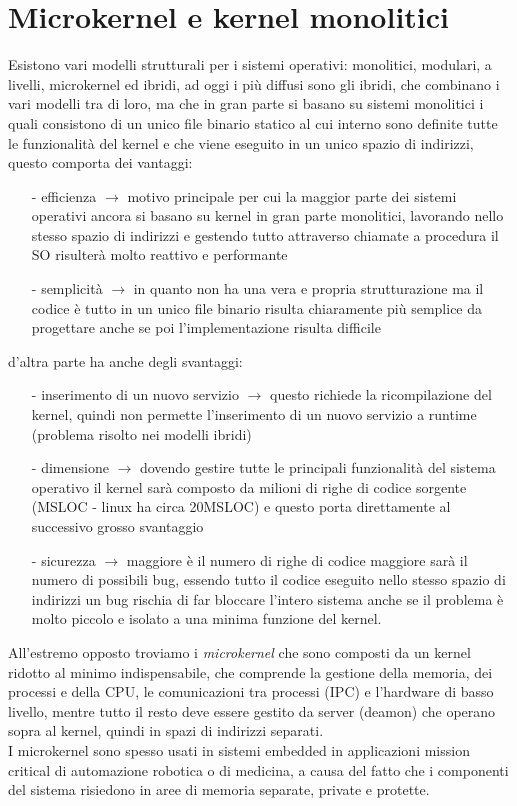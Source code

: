 \section{Microkernel e kernel monolitici}
Esistono vari modelli strutturali per i sistemi operativi: monolitici, modulari, a livelli, microkernel ed ibridi, ad oggi i più diffusi sono gli ibridi, che combinano i vari modelli tra di loro, ma che in gran parte si basano su sistemi monolitici i quali consistono di un unico file binario statico al cui interno sono definite tutte le funzionalità del kernel e che viene eseguito in un unico spazio di indirizzi, questo comporta dei vantaggi: 
\begin{itemize}
	\item[-] efficienza $\rightarrow$ motivo principale per cui la maggior parte dei sistemi operativi ancora si basano su kernel in gran parte monolitici, lavorando nello stesso spazio di indirizzi e gestendo tutto attraverso chiamate a procedura il SO risulterà molto reattivo e performante
	\item[-] semplicità $\rightarrow$ in quanto non ha una vera e  propria strutturazione ma il codice è tutto in un unico file binario risulta chiaramente più semplice da progettare anche se poi l'implementazione risulta difficile
\end{itemize} 
d'altra parte ha anche degli svantaggi: 
\begin{itemize}
	\item[-] inserimento di un nuovo servizio $\rightarrow$ questo richiede la ricompilazione del kernel, quindi non permette l'inserimento di un nuovo servizio a runtime (problema risolto nei modelli ibridi)
	\item[-] dimensione $\rightarrow$ dovendo gestire tutte le principali funzionalità del sistema operativo il kernel sarà composto da milioni di righe di codice sorgente (MSLOC - linux ha circa 20MSLOC) e questo porta direttamente al successivo grosso svantaggio
	\item[-] sicurezza $\rightarrow$ maggiore è il numero di righe di codice maggiore sarà il numero di possibili bug, essendo tutto il codice eseguito nello stesso spazio di indirizzi un bug rischia di far 	bloccare l'intero sistema anche se il problema è molto piccolo e isolato a una minima funzione del kernel.
\end{itemize}
All'estremo opposto troviamo i \textit{microkernel} che sono composti da un kernel ridotto al minimo indispensabile, che comprende la gestione della memoria, dei processi e della CPU, le comunicazioni tra processi (IPC) e l'hardware di basso livello, mentre tutto il resto deve essere gestito da server (deamon) che operano sopra al kernel, quindi in spazi di indirizzi separati.\\ I microkernel sono spesso usati in sistemi embedded in applicazioni mission critical di automazione robotica o di medicina, a causa del fatto che i componenti del sistema risiedono in aree di memoria separate, private e protette.\\
